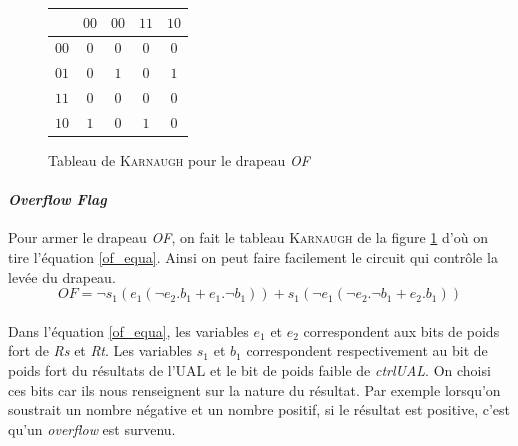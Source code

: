 \begin{figure}
	\centering
	\begin{tabular}{|c|c|c|c|c|}
	\hline \backslashbox{$s_{1}e_{1}$}{$e_ {2}b_{1}$} & $00$ & $00$ & $11$ & $10$ \\ 
	\hline $00$ & $0$ & $0$ & $0$ & $0$ \\ 
	\hline $01$ & $0$ & $1$ & $0$ & $1$ \\ 
	\hline $11$ & $0$ & $0$ & $0$ & $0$ \\ 
	\hline $10$ & $1$ & $0$ & $1$ & $0$ \\ 
	\hline 
	\end{tabular}
	\caption{
		\label{of_karnaugh}
		Tableau de \textsc{Karnaugh} pour le drapeau \textit{OF}
	}
\end{figure}

\paragraph{\textit{Overflow Flag}}{
	Pour armer le drapeau \textit{OF}, on fait le tableau \textsc{Karnaugh}
	de la figure \ref{of_karnaugh} d'où on tire l'équation \ref{of_equa}.
	Ainsi on peut faire facilement le circuit qui contrôle la levée du drapeau. 
}
	\begin{equation}
		\label{of_equa}
		{OF} = \neg s_{1} ( e_{1} ( \neg e_{2} . b_{1} + e_{1} . \neg b_{1} ) ) 
			+ s_{1} ( \neg e_{1} ( \neg e_{2} . \neg b_{1} + e_{2} . b_{1} ))
	\end{equation}

\paragraph{}{
	Dans l'équation \ref{of_equa}, les variables  $e_{1}$ et $e_{2}$ correspondent aux 
	bits de poids fort de \textit{Rs} et \textit{Rt}. Les variables $s_{1}$ et $b_{1}$
	correspondent respectivement au bit de poids fort du résultats de l'UAL et 
	le bit de poids faible de \textit{ctrlUAL}. On choisi ces bits car
	ils nous renseignent sur la nature du résultat. Par exemple lorsqu'on soustrait un 
	nombre négative et un nombre positif, si le résultat est positive, c'est qu'un 
	\textit{overflow} est survenu.
	
}